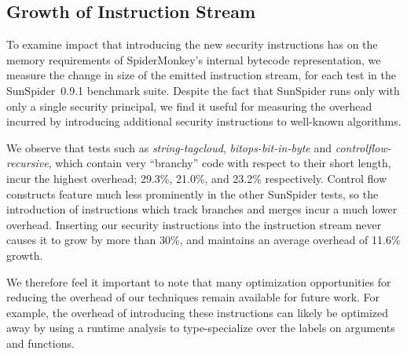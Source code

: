 \subsection{Growth of Instruction Stream}


To examine impact that introducing the new security instructions has on the memory requirements of SpiderMonkey's internal bytecode representation, we measure the change in size of the emitted instruction stream, for each test in the SunSpider~0.9.1 benchmark suite.
Despite the fact that SunSpider runs only with only a single security principal, we find it useful for measuring the overhead incurred by introducing additional security instructions to well-known algorithms.

We observe that tests such as \textit{string-tagcloud}, \textit{bitops-bit-in-byte} and \textit{controlflow-recursive}, which contain very ``branchy'' code with respect to their short length, incur the highest overhead; 29.3\%, 21.0\%, and 23.2\% respectively.
Control flow constructs feature much less prominently in the other SunSpider tests, so the introduction of instructions which track branches and merges incur a much lower overhead.
Inserting our security instructions into the instruction stream never causes it to grow by more than 30\%, and maintains an average overhead of 11.6\% growth.

We therefore feel it important to note that many optimization opportunities for reducing the overhead of our techniques remain available for future work.
For example, the overhead of introducing these instructions can likely be optimized away by using a runtime analysis to type-specialize over the labels on arguments and functions.

